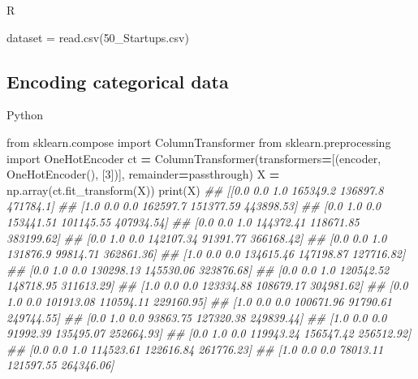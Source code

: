 \documentclass[
]{book}
\newenvironment{Shaded}{\begin{snugshade}}{\end{snugshade}}
\newcommand{\BuiltInTok}[1]{#1}
\newcommand{\CommentTok}[1]{\textcolor[rgb]{0.56,0.35,0.01}{\textit{#1}}}
\newcommand{\DecValTok}[1]{\textcolor[rgb]{0.00,0.00,0.81}{#1}}
\newcommand{\FunctionTok}[1]{\textcolor[rgb]{0.00,0.00,0.00}{#1}}
\newcommand{\ImportTok}[1]{#1}
\newcommand{\NormalTok}[1]{#1}
\newcommand{\OperatorTok}[1]{\textcolor[rgb]{0.81,0.36,0.00}{\textbf{#1}}}
\newcommand{\OtherTok}[1]{\textcolor[rgb]{0.56,0.35,0.01}{#1}}
\newcommand{\StringTok}[1]{\textcolor[rgb]{0.31,0.60,0.02}{#1}}
\theoremstyle{definition}
\theoremstyle{definition}
\theoremstyle{definition}
\theoremstyle{definition}
\theoremstyle{remark}
\begin{document}
R

\begin{Shaded}
\begin{Highlighting}[]
\NormalTok{dataset }\OtherTok{=} \FunctionTok{read.csv}\NormalTok{(}\StringTok{\textquotesingle{}50\_Startups.csv\textquotesingle{}}\NormalTok{)}
\end{Highlighting}
\end{Shaded}

\hypertarget{encoding-categorical-data-1}{%
\subsection{Encoding categorical data}\label{encoding-categorical-data-1}}

Python

\begin{Shaded}
\begin{Highlighting}[]
\ImportTok{from}\NormalTok{ sklearn.compose }\ImportTok{import}\NormalTok{ ColumnTransformer}
\ImportTok{from}\NormalTok{ sklearn.preprocessing }\ImportTok{import}\NormalTok{ OneHotEncoder}
\NormalTok{ct }\OperatorTok{=}\NormalTok{ ColumnTransformer(transformers}\OperatorTok{=}\NormalTok{[(}\StringTok{\textquotesingle{}encoder\textquotesingle{}}\NormalTok{, OneHotEncoder(), [}\DecValTok{3}\NormalTok{])], remainder}\OperatorTok{=}\StringTok{\textquotesingle{}passthrough\textquotesingle{}}\NormalTok{)}
\NormalTok{X }\OperatorTok{=}\NormalTok{ np.array(ct.fit\_transform(X))}
\BuiltInTok{print}\NormalTok{(X)}
\CommentTok{\#\# [[0.0 0.0 1.0 165349.2 136897.8 471784.1]}
\CommentTok{\#\#  [1.0 0.0 0.0 162597.7 151377.59 443898.53]}
\CommentTok{\#\#  [0.0 1.0 0.0 153441.51 101145.55 407934.54]}
\CommentTok{\#\#  [0.0 0.0 1.0 144372.41 118671.85 383199.62]}
\CommentTok{\#\#  [0.0 1.0 0.0 142107.34 91391.77 366168.42]}
\CommentTok{\#\#  [0.0 0.0 1.0 131876.9 99814.71 362861.36]}
\CommentTok{\#\#  [1.0 0.0 0.0 134615.46 147198.87 127716.82]}
\CommentTok{\#\#  [0.0 1.0 0.0 130298.13 145530.06 323876.68]}
\CommentTok{\#\#  [0.0 0.0 1.0 120542.52 148718.95 311613.29]}
\CommentTok{\#\#  [1.0 0.0 0.0 123334.88 108679.17 304981.62]}
\CommentTok{\#\#  [0.0 1.0 0.0 101913.08 110594.11 229160.95]}
\CommentTok{\#\#  [1.0 0.0 0.0 100671.96 91790.61 249744.55]}
\CommentTok{\#\#  [0.0 1.0 0.0 93863.75 127320.38 249839.44]}
\CommentTok{\#\#  [1.0 0.0 0.0 91992.39 135495.07 252664.93]}
\CommentTok{\#\#  [0.0 1.0 0.0 119943.24 156547.42 256512.92]}
\CommentTok{\#\#  [0.0 0.0 1.0 114523.61 122616.84 261776.23]}
\CommentTok{\#\#  [1.0 0.0 0.0 78013.11 121597.55 264346.06]}

\end{Highlighting}
\end{Shaded}
\end{document}
